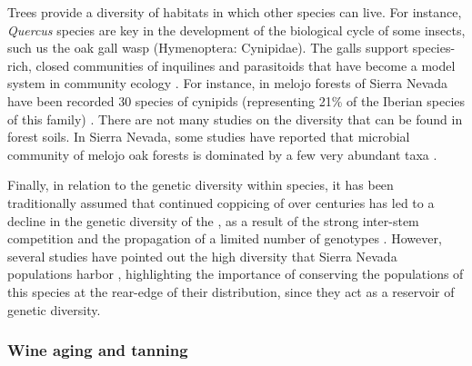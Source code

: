 Trees provide a diversity of habitats in which other species can live. For instance, \emph{Quercus} species are key in the development of the biological cycle of some insects, such us the oak gall wasp (Hymenoptera: Cynipidae). The galls support species-rich, closed communities of inquilines and parasitoids that have become a model system in community ecology \autocites{Stoneetal2002PopulationBiology}. For instance, in melojo forests of Sierra Nevada have been recorded 30 species of cynipids (representing 21\% of the Iberian species of this family) \autocites{NievesAldrey2013AvispasAgallas}. There are not many studies on the diversity that can be found in \Qp forest soils. In Sierra Nevada, some studies have reported that microbial community of melojo oak forests is dominated by a few very abundant taxa \autocites{CoboDiazetal2017TaxonomicFunctional,Lasaetal2019BacteriaEndosphere, Lasaetal2019MetabarcodingReveals}.

Finally, in relation to the genetic diversity within species, it has been traditionally assumed that continued coppicing of over centuries has led to a decline in the genetic diversity of the \Qp, as a result of the strong inter-stem competition and the propagation of a limited number of genotypes \autocites{SanchezPalomaresetal2008EstacionesEcologicas,Bravoetal2008SelviculturaMontes}. However, several studies have pointed out the high diversity that Sierra Nevada \Qp populations harbor \autocites{ValbuenaCarabanaGil2013GeneticResilience,ValbuenaCarabanaGil2013ReduceAprovechamiento,ValbuenaCarabanaGil2014EfectosGestion,ValbuenaCarabanaGil2017CentenaryCoppicing}, highlighting the importance of conserving the populations of this species at the rear-edge of their distribution, since they act as a reservoir of genetic diversity.

\subsubsection{Wine aging and tanning}\label{sec:es:provision-wine}

